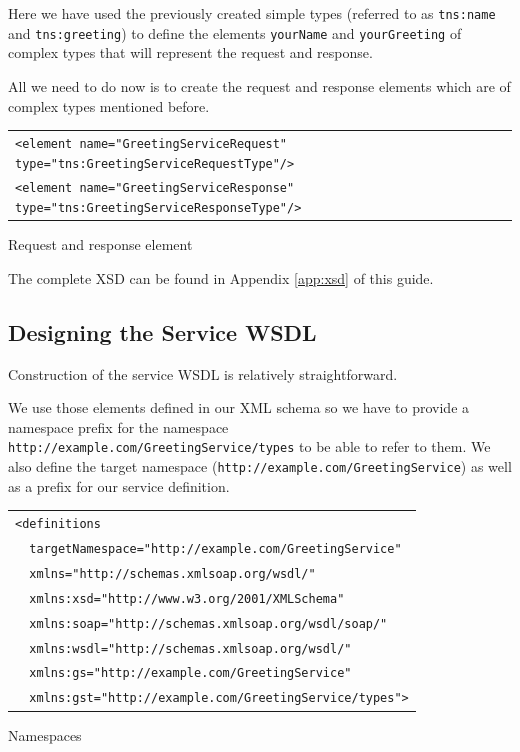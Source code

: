 \documentclass{article}
\begin{document}
\pagebreak

Here we have used the previously created simple types (referred to as
\verb#tns:name# and \verb#tns:greeting#) to define the elements
\verb#yourName# and \verb#yourGreeting# of complex types that will
represent the request and response.

All we need to do now is to create the request and response elements
which are of complex types mentioned before.

\begin{illustration}
\begin{center}
\begin{tabular}{|l|}
\hline
\verb#<element name="GreetingServiceRequest" type="tns:GreetingServiceRequestType"/>#\\ 
\verb#<element name="GreetingServiceResponse" type="tns:GreetingServiceResponseType"/>#\\ 
\hline
\end{tabular}
\end{center}
\caption{Request and response element}
\end{illustration}

The complete XSD can be found in Appendix \ref{app:xsd} of this guide.


\subsection{Designing the Service WSDL}

Construction of the service WSDL is relatively straightforward.

We use those elements defined in our XML schema so we have to
provide a namespace prefix for the namespace
\verb#http://example.com/GreetingService/types# to be able to refer to
them. We also define the target namespace
(\verb#http://example.com/GreetingService#) as well as a prefix for
our service definition.

\begin{illustration}
\begin{center}
\begin{tabular}{|l|}
\hline
\verb#<definitions#\\ 
\verb#  targetNamespace="http://example.com/GreetingService"#\\ 
\verb#  xmlns="http://schemas.xmlsoap.org/wsdl/"#\\ 
\verb#  xmlns:xsd="http://www.w3.org/2001/XMLSchema"#\\ 
\verb#  xmlns:soap="http://schemas.xmlsoap.org/wsdl/soap/"#\\ 
\verb#  xmlns:wsdl="http://schemas.xmlsoap.org/wsdl/"#\\ 
\verb#  xmlns:gs="http://example.com/GreetingService"#\\ 
\verb#  xmlns:gst="http://example.com/GreetingService/types">#\\
\hline
\end{tabular}
\end{center}
\caption{Namespaces}
\end{illustration}
\end{document}
